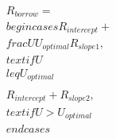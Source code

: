 \documentclass[preview]{standalone}
\begin{document}
\begin{align*}
R_{borrow} = \\begin{cases}R_{intercept} + \\frac{U}{U_{optimal}}R_{slope1}, & \\text{if } U \\leq U_{optimal} \\\\R_{intercept} + R_{slope2}, & \\text{if } U > U_{optimal}\\end{cases}
\end{align*}
\end{document}
